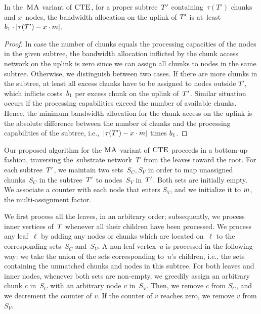\begin{lemma}\label{lem:uplink-alloc}
In the~$\textsc{MA}$ variant of $\textsc{CTE}$, for a proper subtree~$T'$
containing~$\tau(T')$
chunks and $x$~nodes, the bandwidth allocation on the uplink of $T'$ is at~least ${b_1\cdot|\tau(T')-x\cdot m|}$.
\label{lemma:uplink}
\end{lemma}
\begin{proof}
In case the number of chunks equals the processing capacities of the
nodes in the given subtree,
the bandwidth allocation inflicted by the chunk access network on the uplink is zero since we can assign all chunks to nodes in the same subtree.
Otherwise, we distinguish between two cases. If there are more chunks in the subtree, at least all excess chunks have to
be assigned to nodes outside $T'$, which 
inflicts costs~$b_1$ per excess chunk on the uplink of~$T'$.
 Similar situation occurs if the processing capabilities exceed the
number of
available chunks.
Hence, the minimum bandwidth allocation for the chunk access on the uplink
is the absolute difference between the number of chunks and the processing capabilities
of the subtree, i.e.,~$|\tau(T')-x\cdot m|$ times $b_1$.
\end{proof}


 Our proposed algorithm for the $\textsc{MA}$ variant of $\textsc{CTE}$
proceeds in a bottom-up fashion, traversing the~substrate network~$T$
from the leaves toward the root.
For each subtree~$T'$, we maintain
two sets~$S_C,S_V$ in order to map unassigned
chunks~$S_C$ in the subtree~$T'$ to 
nodes~$S_V$ in~$T'$. Both sets are initially empty.
We associate a counter with each node that enters $S_V$, and we initialize it to $m$, the multi-assignment factor.


We first process all the leaves, in an arbitrary order; subsequently, we process inner vertices
of~$T$ whenever all their children have been processed.
We process any leaf~$\ell$
by adding any
nodes or chunks which are located on~$\ell$ to the corresponding sets~$S_C$ and~$S_V$.
A non-leaf vertex~$u$ is processed in the following way: we take the union of
the sets corresponding to~$u$'s children, i.e., the sets containing the unmatched chunks and nodes
in this subtree.
For both leaves and inner nodes, whenever
both sets are non-empty, we greedily assign an arbitrary chunk $c$ in~$S_C$ with an arbitrary node $v$ in~$S_V$.
Then, we remove $c$ from $S_C$, and we decrement the counter of $v$. If the counter of $v$ reaches zero, we remove $v$ from $S_V$.

